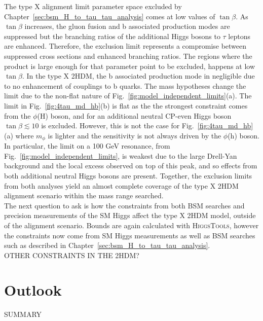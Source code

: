 The type X alignment limit parameter space excluded by Chapter~\ref{sec:bsm_H_to_tau_tau_analysis} comes at low values of $\tan\beta$.
As $\tan\beta$ increases, the gluon fusion and b associated production modes are suppressed but the branching ratios of the additional Higgs bosons to $\tau$ leptons are enhanced.
Therefore, the exclusion limit represents a compromise between suppressed cross sections and enhanced branching ratios. 
The regions where the product is large enough for that parameter point to be excluded, happens at low $\tan\beta$.
In the type X 2HDM, the b associated production mode in negligible due to no enhancement of couplings to b quarks.
The mass hypotheses change the limit due to the non-flat nature of Fig.~\ref{fig:model_independent_limits}(a).
The limit in Fig.~\ref{fig:4tau_md_hb}(b) is flat as the the strongest constraint comes from the $\phi$(H) boson, and for an additional neutral CP-even Higgs boson $\tan\beta \lesssim 10$ is excluded.
However, this is not the case for Fig.~\ref{fig:4tau_md_hb}(a) where $m_{\phi}$ is lighter and the sensitivity is not always driven by the $\phi$(h) boson.
In particular, the limit on a 100 GeV resonance, from Fig.~\ref{fig:model_independent_limits}, is weakest due to the large Drell-Yan background and the local excess observed on top of this peak, and so effects from both additional neutral Higgs bosons are present.
Together, the exclusion limits from both analyses yield an almost complete coverage of the type X 2HDM alignment scenario within the mass range searched. \\

The next question to ask is how the constraints from both BSM searches and precision measurements of the SM Higgs affect the type X 2HDM model, outside of the alignment scenario.
Bounds are again calculated with \textsc{HiggsTools}, however the constraints now come from SM Higgs measurements as well as BSM searches such as described in Chapter~\ref{sec:bsm_H_to_tau_tau_analysis}. \\

OTHER CONSTRAINTS IN THE 2HDM? \\

\section{Outlook}

SUMMARY \\